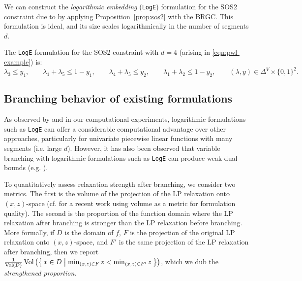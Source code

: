 \documentclass[opre,nonblindrev]{informs3} %
\newcommand{\Vol}{\operatorname{Vol}}
\newcommand{\Log}{\texttt{LogE}}
\newcommand{\LogIB}{\texttt{LogIB}}
\begin{document}
We can construct the \emph{logarithmic embedding} (\Log{}) formulation for the SOS2 constraint due to \cite{Vielma:2016} by applying Proposition~\ref{prop:sos2} with the BRGC. This formulation is ideal, and its size scales logarithmically in the number of segments $d$. %

\begin{example}\label{example:sos2}
The \Log{} formulation for the SOS2 constraint with $d=4$ (arising in \eqref{eqn:pwl-example}) is:
\begin{equation}\label{eqn:log-example}
    \lambda_3 \leq y_1, \quad\quad \lambda_1 + \lambda_5 \leq 1 - y_1, \quad\quad \lambda_4 + \lambda_5 \leq y_2, \quad\quad \lambda_1 + \lambda_2 \leq 1-y_2, \quad\quad (\lambda,y) \in \Delta^{V} \times \{0,1\}^2.
\end{equation}
\end{example}

\subsection{Branching behavior of existing formulations}

As observed by \cite{Vielma:2010} and in our computational experiments, logarithmic formulations such as \Log{} can offer a considerable computational advantage over other approaches, particularly for univariate piecewise linear functions with many segments (i.e. large $d$). However, it has also been observed that variable branching with logarithmic formulations such as \Log{} can produce weak dual bounds (e.g. \cite{Martin:2006,Rebennack:2016,Yildiz:2013}). 

To quantitatively assess relaxation strength after branching, we consider two metrics. The first is the volume of the projection of the LP relaxation onto $(x,z)$-space (cf. \citep{Lee:2018} for a recent work using volume as a metric for formulation quality). The second is the proportion of the function domain where the LP relaxation after branching is stronger than the LP relaxation before branching. More formally, if $D$ is the domain of $f$, $F$ is the projection of the original LP relaxation onto $(x,z)$-space, and $F'$ is the same projection of the LP relaxation after branching, then we report $\frac{1}{\Vol(D)}\Vol\left(\Set{x \in D | \min_{(x,z) \in F} z < \min_{(x,z) \in F'} z }\right)$, which we dub the \emph{strengthened proportion}.
\end{document}
